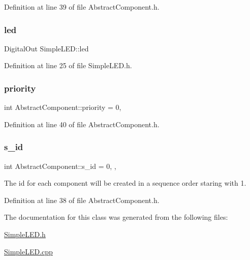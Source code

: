 Definition at line 39 of file Abstract\+Component.\+h.

\mbox{\label{class_simple_l_e_d_ae16514a63d8a19ab12e9adb19bba086d}} 
\subsubsection{\texorpdfstring{led}{led}}
{\footnotesize\ttfamily Digital\+Out Simple\+L\+E\+D\+::led\hspace{0.3cm}{\ttfamily [private]}}



Definition at line 25 of file Simple\+L\+E\+D.\+h.

\mbox{\label{class_abstract_component_aff57dfa5f31be093a06b55560e33fb95}} 
\subsubsection{\texorpdfstring{priority}{priority}}
{\footnotesize\ttfamily int Abstract\+Component\+::priority = 0\hspace{0.3cm}{\ttfamily [protected]}, {\ttfamily [inherited]}}



Definition at line 40 of file Abstract\+Component.\+h.

\mbox{\label{class_abstract_component_a99ce3e5fe7d73dac569b874c15fcaf0d}} 
\subsubsection{\texorpdfstring{s\+\_\+id}{s\_id}}
{\footnotesize\ttfamily int Abstract\+Component\+::s\+\_\+id = 0\hspace{0.3cm}{\ttfamily [static]}, {\ttfamily [protected]}, {\ttfamily [inherited]}}



The id for each component will be created in a sequence order staring with 1. 



Definition at line 38 of file Abstract\+Component.\+h.



The documentation for this class was generated from the following files\+:\begin{DoxyCompactItemize}
\item 
\hyperlink{_simple_l_e_d_8h}{Simple\+L\+E\+D.\+h}\item 
\hyperlink{_simple_l_e_d_8cpp}{Simple\+L\+E\+D.\+cpp}\end{DoxyCompactItemize}
